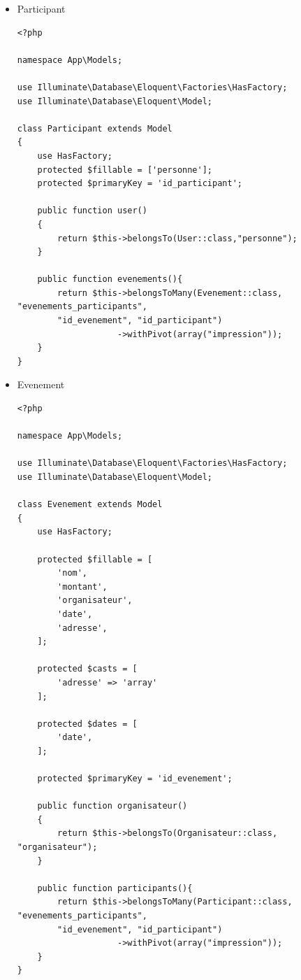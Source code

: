\documentclass[12pt,a4paper]{article}
\begin{document}
\begin{itemize}
\begin{verbatim}
    public function evenements()
    {
        return $this->hasMany(Evenement::class, "organisateur");
    }
}
\end{verbatim}


\item[•] Participant



\begin{verbatim}
<?php

namespace App\Models;

use Illuminate\Database\Eloquent\Factories\HasFactory;
use Illuminate\Database\Eloquent\Model;

class Participant extends Model
{
    use HasFactory;
    protected $fillable = ['personne'];
    protected $primaryKey = 'id_participant';

    public function user()
    {
        return $this->belongsTo(User::class,"personne");
    }

    public function evenements(){
        return $this->belongsToMany(Evenement::class, "evenements_participants", 
        "id_evenement", "id_participant")
                    ->withPivot(array("impression"));
    }
}
\end{verbatim}


\item[•] Evenement


\begin{verbatim}
<?php

namespace App\Models;

use Illuminate\Database\Eloquent\Factories\HasFactory;
use Illuminate\Database\Eloquent\Model;

class Evenement extends Model
{
    use HasFactory;

    protected $fillable = [
        'nom',
        'montant',
        'organisateur',
        'date',
        'adresse',
    ];

    protected $casts = [
        'adresse' => 'array'
    ];

    protected $dates = [
        'date',
    ];

    protected $primaryKey = 'id_evenement';

    public function organisateur()
    {
        return $this->belongsTo(Organisateur::class, "organisateur");
    }

    public function participants(){
        return $this->belongsToMany(Participant::class, "evenements_participants", 
        "id_evenement", "id_participant")
                    ->withPivot(array("impression"));
    }
}

\end{verbatim}



\end{itemize}
\end{document}
